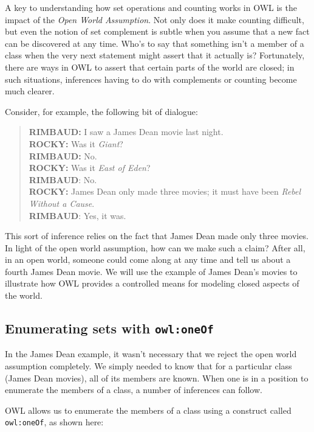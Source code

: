 A key to understanding how set operations and counting works in OWL is
the impact of the \emph{Open World Assumption}. Not only does it make counting
difficult, but even the notion of set complement is subtle when you
assume that a new fact can be discovered at any time. Who's to say that
something isn't a member of a class when the very next statement might
assert that it actually is? Fortunately, there are ways in OWL to assert
that certain parts of the world are closed; in such situations,
inferences having to do with complements or counting become much
clearer.

Consider, for example, the following bit of dialogue:

\begin{quote}
\textbf{RIMBAUD:} I saw a James Dean movie last night. \\
\textbf{ROCKY:} Was it \emph{Giant}?\\
\textbf{RIMBAUD:} No.\\
\textbf{ROCKY:} Was it \emph{East of Eden}?\\
\textbf{RIMBAUD}: No.\\
\textbf{ROCKY:} James Dean only made three movies; it must have been \emph{Rebel Without a Cause}.\\
\textbf{RIMBAUD}: Yes, it was.
\end{quote}

This sort of inference relies on the fact that James Dean made only
three movies. In light of the open world assumption, how can we make
such a claim? After all, in an open world, someone could come along at
any time and tell us about a fourth James Dean movie. We will use the
example of James Dean's movies to illustrate how OWL provides a
controlled means for modeling closed aspects of the world.

\subsection{Enumerating sets with \texttt{owl:oneOf}}

In the James Dean example, it wasn't necessary that we reject the open
world assumption completely. We simply needed to know that for a
particular class (James Dean movies), all of its members are known. When
one is in a position to enumerate the members of a class, a number of
inferences can follow.

OWL allows us to enumerate the members of a class using a construct
called \texttt{owl:oneOf}, as shown here:

